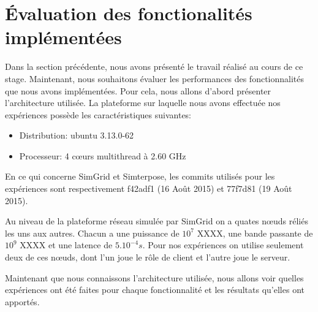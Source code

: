 \section{Évaluation des fonctionalités implémentées}
\label{section:evaluation}

Dans la section précédente, nous avons présenté le travail réalisé au cours de ce stage. Maintenant, nous souhaitons évaluer les performances des fonctionnalités que nous avons implémentées. Pour cela, nous allons d'abord présenter l'architecture utilisée. La plateforme sur laquelle nous avons effectuée nos expériences possède les caractéristiques suivantes:
\begin{itemize}
\item Distribution: ubuntu 3.13.0-62
\item Processeur: 4 c\oe urs multithread à 2.60 GHz
\end{itemize}
En ce qui concerne SimGrid et Simterpose, les commits utilisés pour les expériences sont respectivement f42adf1 (16 Août 2015) et 77f7d81 (19 Août 2015). 

Au niveau de la plateforme réseau simulée par SimGrid on a quates n\oe uds réliés les uns aux autres. Chacun a une puissance de $10^7$ {\color{red} XXXX}, une bande passante de $10^9$ {\color{red} XXXX} et une latence de $5.10^{-4}s$. Pour nos expériences on utilise seulement deux de ces n\oe uds, dont l'un joue le rôle de client et l'autre joue le serveur. 

Maintenant que nous connaissons l'architecture utilisée, nous allons voir quelles expériences ont été faites pour chaque fonctionnalité et les résultats qu'elles ont apportés.
